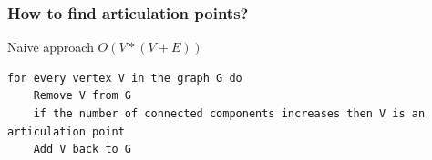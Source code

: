 \documentclass[twoside]{article}
\begin{document}
\subsubsection*{How to find articulation points?}
\bullet Naive approach $O(V * (V + E))$

\begin{verbatim}
for every vertex V in the graph G do
    Remove V from G
    if the number of connected components increases then V is an articulation point
    Add V back to G
\end{verbatim}
\begin{multicols*}{2}
\end{multicols*}
\end{document}
